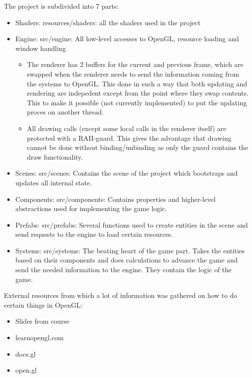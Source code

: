 \documentclass[]{article}
\begin{document}
The project is subdivided into 7 parts:
\begin{itemize}
    \item Shaders: resources/shaders: all the shaders used in the project
    \item Engine: src/engine: All low-level accesses to OpenGL, resource loading
          and window handling
          \begin{itemize}
              \item The renderer has 2 buffers for the current and previous
                    frame, which are swapped when the renderer needs to send the
                    information coming from the systems to OpenGL. This done in
                    such a way that both updating and rendering are indepedent
                    except from the point where they swap contents. This to make
                    it possible (not currently implemented) to put the updating
                    proces on another thread.
              \item All drawing calls (except some local calls in the renderer
                    itself) are protected with a RAII-guard. This gives the
                    advantage that drawing cannot be done without
                    binding/unbinding as only the guard contains the draw
                    functionality.
          \end{itemize}
    \item Scenes: src/scenes: Contains the scene of the project which bootstraps
          and updates all internal state.
    \item Components: src/components: Contains properties and higher-level
          abstractions used for implementing the game logic.
    \item Prefabs: src/prefabs: Several functions used to create entities in the
          scene and send requests to the engine to load certain resources.
    \item Systems: src/systems: The beating heart of the game part. Takes the
          entities based on their components and does calculations to advance
          the game and send the needed information to the engine. They contain
          the logic of the game.
\end{itemize}

External resources from which a lot of information was gathered on how to do
certain things in OpenGL:
\begin{itemize}
    \item Slides from course
    \item learnopengl.com
    \item docs.gl
    \item open.gl
\end{itemize}
\end{document}
